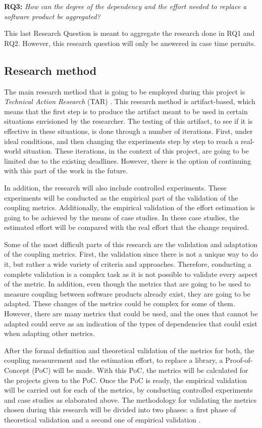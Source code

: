 \blankl
\textbf{RQ3:} \textit{How can the degree of the dependency and the effort needed to replace a software product be aggregated?}

This last Research Question is meant to aggregate the research done in RQ1 and RQ2. However, this research question will only be answered in case time permits.

\subsection{Research method}
The main research method that is going to be employed during this project is \textit{Technical Action Research} (TAR) \cite{wieringa2012technical}.
This research method is artifact-based, which means that the first step is to produce the artifact meant to be used in certain situations envisioned by the researcher. The testing of this artifact, to see if it is effective in these situations, is done through a number of iterations. First, under ideal conditions, and then changing the experiments step by step to reach a real-world situation. These iterations, in the context of this project, are going to be limited due to the existing deadlines. However, there is the option of continuing with this part of the work in the future.

\blankl
In addition, the research will also include controlled experiments. These experiments will be conducted as the empirical part of the validation of the coupling metrics. Additionally, the empirical validation of the effort estimation is going to be achieved by the means of case studies. In these case studies, the estimated effort will be compared with the real effort that the change required.

\blankl
Some of the most difficult parts of this research are the validation and adaptation of the coupling metrics.
First, the validation since there is not a unique way to do it, but rather a wide variety of criteria and approaches. Therefore, conducting a complete validation is a complex task as it is not possible to validate every aspect of the metric.
In addition, even though the metrics that are going to be used to measure coupling between software products already exist, they are going to be adapted. These changes of the metrics could be complex for some of them. However, there are many metrics that could be used, and the ones that cannot be adapted could serve as an indication of the types of dependencies that could exist when adapting other metrics.

\blankl
After the formal definition and theoretical validation of the metrics for both, the coupling measurement and the estimation effort, to replace a library, a Proof-of-Concept (PoC) will be made. With this PoC, the metrics will be calculated for the projects given to the PoC. Once the PoC is ready, the empirical validation will be carried out for each of the metrics, by conducting controlled experiments and case studies as elaborated above.
The methodology for validating the metrics chosen during this research will be divided into two phases: a first phase of theoretical validation and a second one of empirical validation \cite{srinivasan2014software}.

